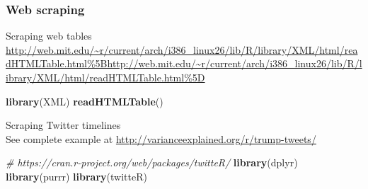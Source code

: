 \documentclass[10,portrait]{article}
\newenvironment{Shaded}{\begin{snugshade}}{\end{snugshade}}
\newcommand{\KeywordTok}[1]{\textcolor[rgb]{0.13,0.29,0.53}{\textbf{#1}}}
\newcommand{\CommentTok}[1]{\textcolor[rgb]{0.56,0.35,0.01}{\textit{#1}}}
\newcommand{\NormalTok}[1]{#1}
\begin{document}
\subsubsection{Web scraping}\label{web-scraping}

Scraping web tables\\
\url{http://web.mit.edu/~r/current/arch/i386_linux26/lib/R/library/XML/html/readHTMLTable.html\%5Bhttp://web.mit.edu/~r/current/arch/i386_linux26/lib/R/library/XML/html/readHTMLTable.html\%5D}

\begin{Shaded}
\begin{Highlighting}[]
\KeywordTok{library}\NormalTok{(XML)}
\KeywordTok{readHTMLTable}\NormalTok{()}
\end{Highlighting}
\end{Shaded}

Scraping Twitter timelines\\
See complete example at
\url{http://varianceexplained.org/r/trump-tweets/}

\begin{Shaded}
\begin{Highlighting}[]
\CommentTok{# https://cran.r-project.org/web/packages/twitteR/}
\KeywordTok{library}\NormalTok{(dplyr)}
\KeywordTok{library}\NormalTok{(purrr)}
\KeywordTok{library}\NormalTok{(twitteR)}
\end{Highlighting}
\end{Shaded}

\printbibliography
\end{document}
